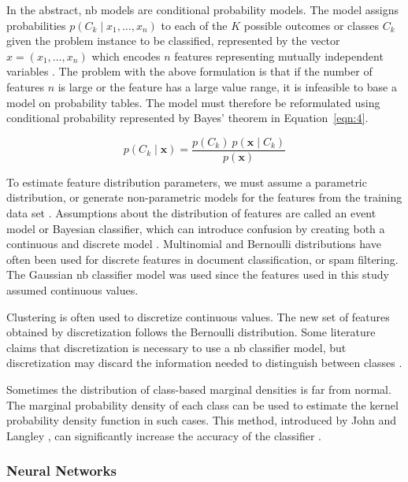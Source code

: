 \documentclass[sn-mathphys-num]{sn-jnl}%
\begin{document}
In the abstract, \acrshort{nb} models are conditional probability models. The model assigns probabilities $p(C_{k}\mid x_{1},\ldots, x_{n})$ to each of the $K$ possible outcomes or classes $C_{k}$ given the problem instance to be classified, represented by the vector $x = (x_{1},\ldots, x_{n})$ which encodes $n$ features representing mutually independent variables \cite{Murty2011}. The problem with the above formulation is that if the number of features $n$ is large or the feature has a large value range, it is infeasible to base a model on probability tables. The model must therefore be reformulated using conditional probability represented by Bayes' theorem in Equation~\ref{eqn:4}.

\begin{equation}
	p(C_{k}\mid \mathbf{x})={\frac{p(C_{k})\ p(\mathbf{x} \mid C_{k})}{p(\mathbf{x})}}
	\label{eqn:4}
\end{equation}

To estimate feature distribution parameters, we must assume a parametric distribution, or generate non-parametric models for the features from the training data set \cite{John2013}. Assumptions about the distribution of features are called an event model or Bayesian classifier, which can introduce confusion by creating both a continuous and discrete model \cite{Mccallum2001, Metsis2006}. Multinomial and Bernoulli distributions have often been used for discrete features in document classification, or spam filtering. The Gaussian \acrshort{nb} classifier model was used since the features used in this study assumed continuous values.

Clustering is often used to discretize continuous values. The new set of features obtained by discretization follows the Bernoulli distribution. Some literature claims that discretization is necessary to use a \acrshort{nb} classifier model, but discretization may discard the information needed to distinguish between classes \cite{Hand2001}.

Sometimes the distribution of class-based marginal densities is far from normal. The marginal probability density of each class can be used to estimate the kernel probability density function in such cases. This method, introduced by John and Langley \cite{John2013}, can significantly increase the accuracy of the classifier \cite{Piryonesi2020, HastieRosset2009}.

\subsubsection{Neural Networks}
\end{document}
